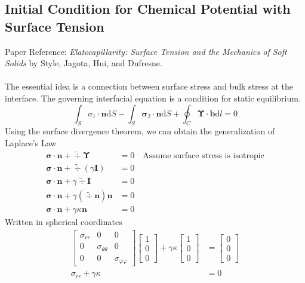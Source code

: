 \documentclass[12pt,3p]{article}
\numberwithin{equation}{section}
\begin{document}
\subsection{Initial Condition for Chemical Potential with Surface Tension}
Paper Reference: \textit{Elatocapillarity: Surface Tension and the Mechanics of Soft Solids} by Style, Jagota, Hui, and Dufresne. \\ \\
The essential idea is a connection between surface stress and bulk stress at the interface. The governing interfacial equation is a condition for static equilibrium. 
\begin{equation*}
\int_{S} \sigma_{1} \cdot \mathbf{n} \mathrm{d} S-\int_{S} \boldsymbol{\sigma}_{2} \cdot \mathbf{n} \mathrm{d} S+\oint_{C} \mathbf{\Upsilon} \cdot \mathbf{b} \mathrm{d} l=0
\end{equation*}
Using the surface divergence theorem, we can obtain the generalization of Laplace's Law
\begin{align*}
\boldsymbol{\sigma} \cdot \mathbf{n} + \tilde{\div} \boldsymbol{\Upsilon} &= 0 \quad \text{Assume surface stress is isotropic} \\
\boldsymbol{\sigma} \cdot \mathbf{n} + \tilde{\div} (\gamma \mathbf{I}) &= 0 \\
\boldsymbol{\sigma} \cdot \mathbf{n} + \gamma \tilde{\div} \mathbf{I} &= 0 \\
\boldsymbol{\sigma} \cdot \mathbf{n} + \gamma (\tilde{\div} \mathbf{n}) \mathbf{n} &= 0 \\
\boldsymbol{\sigma} \cdot \mathbf{n} + \gamma \kappa \mathbf{n} &= 0 
\end{align*}
Written in spherical coordinates
\begin{align*}
\begin{bmatrix}
\sigma_{rr} & 0 				       & 0 \\
0		  & \sigma_{\theta \theta} & 0 \\
0		  & 0 				       & \sigma_{\varphi \varphi} 
\end{bmatrix}
\begin{bmatrix}
1 \\
0 \\
0
\end{bmatrix} 
+ \gamma \kappa
\begin{bmatrix}
1 \\
0 \\
0
\end{bmatrix} &= 
\begin{bmatrix}
0 \\
0 \\
0
\end{bmatrix} \\
\sigma_{rr} + \gamma \kappa &= 0
\end{align*}
\end{document}
